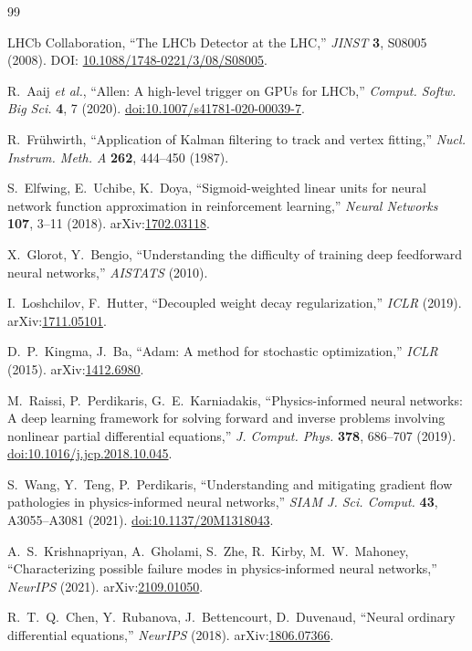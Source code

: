 \documentclass[a4paper,11pt]{article}
\begin{document}
\begin{thebibliography}{99}
\small

LHCb Collaboration, ``The LHCb Detector at the LHC,''
\emph{JINST} \textbf{3}, S08005 (2008). DOI:
\href{https://doi.org/10.1088/1748-0221/3/08/S08005}{10.1088/1748-0221/3/08/S08005}.

R.~Aaij \emph{et al.}, ``Allen: A high-level trigger on GPUs for LHCb,''
\emph{Comput. Softw. Big Sci.} \textbf{4}, 7 (2020).
\href{https://doi.org/10.1007/s41781-020-00039-7}{doi:10.1007/s41781-020-00039-7}.

R.~Fr{\"u}hwirth, ``Application of Kalman filtering to track and vertex
fitting,'' \emph{Nucl. Instrum. Meth. A} \textbf{262}, 444--450 (1987).

S.~Elfwing, E.~Uchibe, K.~Doya, ``Sigmoid-weighted linear units for
neural network function approximation in reinforcement learning,''
\emph{Neural Networks} \textbf{107}, 3--11 (2018).
arXiv:\href{https://arxiv.org/abs/1702.03118}{1702.03118}.

X.~Glorot, Y.~Bengio, ``Understanding the difficulty of training deep
feedforward neural networks,'' \emph{AISTATS} (2010).

I.~Loshchilov, F.~Hutter, ``Decoupled weight decay regularization,''
\emph{ICLR} (2019).
arXiv:\href{https://arxiv.org/abs/1711.05101}{1711.05101}.

D.~P.~Kingma, J.~Ba, ``Adam: A method for stochastic optimization,''
\emph{ICLR} (2015).
arXiv:\href{https://arxiv.org/abs/1412.6980}{1412.6980}.

M.~Raissi, P.~Perdikaris, G.~E.~Karniadakis, ``Physics-informed neural
networks: A deep learning framework for solving forward and inverse
problems involving nonlinear partial differential equations,''
\emph{J. Comput. Phys.} \textbf{378}, 686--707 (2019).
\href{https://doi.org/10.1016/j.jcp.2018.10.045}{doi:10.1016/j.jcp.2018.10.045}.

S.~Wang, Y.~Teng, P.~Perdikaris, ``Understanding and mitigating gradient
flow pathologies in physics-informed neural networks,''
\emph{SIAM J. Sci. Comput.} \textbf{43}, A3055--A3081 (2021).
\href{https://doi.org/10.1137/20M1318043}{doi:10.1137/20M1318043}.

A.~S.~Krishnapriyan, A.~Gholami, S.~Zhe, R.~Kirby, M.~W.~Mahoney,
``Characterizing possible failure modes in physics-informed neural
networks,'' \emph{NeurIPS} (2021).
arXiv:\href{https://arxiv.org/abs/2109.01050}{2109.01050}.

R.~T.~Q.~Chen, Y.~Rubanova, J.~Bettencourt, D.~Duvenaud, ``Neural
ordinary differential equations,'' \emph{NeurIPS} (2018).
arXiv:\href{https://arxiv.org/abs/1806.07366}{1806.07366}.

\end{thebibliography}
\end{document}
